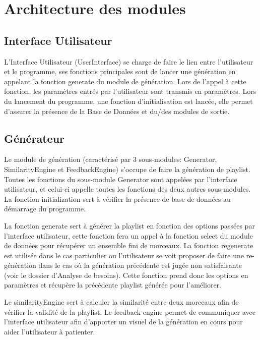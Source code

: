 
\section{Architecture des modules}

\subsection{Interface Utilisateur}

L'Interface Utilisateur (UserInterface) se charge de faire le lien entre
l'utilisateur et le programme, ses fonctions principales sont de lancer une
génération en appelant la fonction generate du module de génération. Lors
de l'appel à cette fonction, les paramètres entrés par l'utilisateur sont
transmis en paramètres. Lors du lancement du programme, une fonction
d'initialisation est lancée, elle permet d'assurer la présence de la Base de
Données et du/des modules de sortie.

\subsection{Générateur}

Le module de génération (caractérisé par 3 sous-modules: Generator, 
SimilarityEngine et FeedbackEngine) s'occupe de faire la génération de
playlist. Toutes les fonctions du sous-module Generator sont appelées par
l'interface utilisateur, et celui-ci appelle toutes les fonctions des deux
autres sous-modules. La fonction initialization sert à vérifier la présence de
base de données au démarrage du programme. 

La fonction generate sert à générer la playlist en fonction des options passées 
par l'interface utilisateur, cette fonction fera un appel à la fonction
select du module de données pour récupérer un ensemble fini de morceaux. La 
fonction regenerate est utilisée dans le cas particulier ou l'utilisateur se 
voit proposer de faire une re-génération dans le cas où la génération précédente 
est jugée non satisfaisante (voir le dossier d'Analyse de besoins). Cette 
fonction prend donc les options en paramètres et récupère la précèdente playlist 
générée pour l'améliorer.

Le similarityEngine sert à calculer la similarité entre deux 
morceaux afin de vérifier la validité de la playlist. Le feedback engine 
permet de communiquer avec l'interface utilisateur afin d'apporter un visuel 
de la génération en cours pour aider l'utilisateur à patienter.

